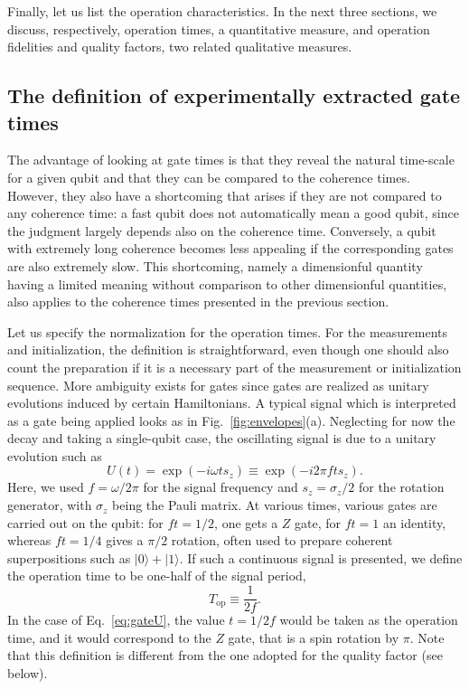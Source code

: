 \documentclass[aps, prx, showpacs, twocolumn, superscriptaddress, notitlepage, longbibliography, floatfix, nofootinbib]{revtex4-2}
\begin{document}
Finally, let us list the operation characteristics. In the next three sections, we discuss, respectively, operation times, a quantitative measure, and operation fidelities and quality factors, two related qualitative measures. 


\subsection{The definition of experimentally extracted gate times}

The advantage of looking at gate times is that they reveal the natural time-scale for a given qubit and that they can be compared to the coherence times. However, they also have a shortcoming that arises if they are not compared to any coherence time: a fast qubit does not automatically mean a good qubit, since the judgment largely depends also on the coherence time. Conversely, a qubit with extremely long coherence becomes less appealing if the corresponding gates are also extremely slow. This shortcoming, namely a dimensionful quantity having a limited meaning without comparison to other dimensionful quantities, also applies to the coherence times presented in the previous section. 


Let us specify the normalization for the operation times. For the measurements and initialization, the definition is straightforward, even though one should also count the preparation if it is a necessary part of the measurement or initialization sequence. More ambiguity exists for gates since gates are realized as unitary evolutions induced by certain Hamiltonians. A typical signal which is interpreted as a gate being applied looks as in Fig.~\ref{fig:envelopes}(a). Neglecting for now the decay and taking a single-qubit case, the oscillating signal is due to a unitary evolution such as
\begin{equation}
U(t) = \exp\left( -i \omega t s_z \right) \equiv \exp \left( -i 2\pi f t s_z \right).
\label{eq:gateU}
\end{equation}
Here, we used $f = \omega / 2\pi$ for the signal frequency and $s_z = \sigma_z/2$ for the rotation generator, with $\sigma_z$ being the Pauli matrix.
At various times, various gates are carried out on the qubit: for $f t=1/2$, one gets a $Z$ gate, for $f t=1$ an identity, whereas $f t=1/4$ gives a $\pi/2$ rotation, often used to prepare coherent superpositions such as $|0\rangle +|1\rangle$. If such a continuous signal is presented, we define the operation time to be one-half of the signal period,
\begin{equation}
T_\mathrm{op} \equiv \frac{1}{2f}.
\label{eq:gateTime}
\end{equation}
In the case of Eq.~\eqref{eq:gateU}, the value $t=1/2f$ would be taken as the operation time, and it would correspond to the $Z$ gate, that is a spin rotation by $\pi$. Note that this definition is different from the one adopted for the quality factor (see below).
\end{document}
